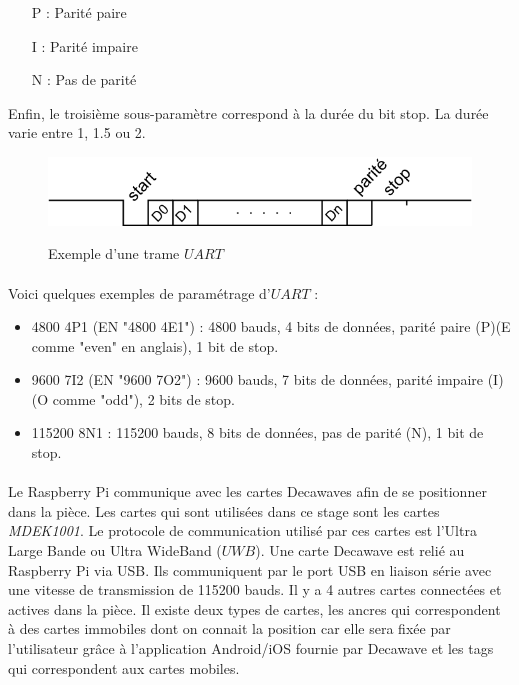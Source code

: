         \begin{itemize}
            \item[P : ] Parité paire
            \item[I : ] Parité impaire
            \item[N : ] Pas de parité 
        \end{itemize}
        
        Enfin, le troisième sous-paramètre correspond à la durée du bit stop. La durée varie entre 1, 1.5 ou 2.
        
        \begin{figure}[H]
            \centering
        	\begin{frame}{\includegraphics[width=1\textwidth]{image/trame_uart.png}}
        	\end{frame}
        	\caption{\label{fig:trameUART}Exemple d'une trame $UART$}
        \end{figure}
        
        \paragraph*{}
        Voici quelques exemples de paramétrage d'$UART$ :
        
        \begin{itemize}
            \item 4800 4P1 (EN "4800 4E1") : 4800 bauds, 4 bits de données, parité paire (P)(E comme "even" en anglais), 1 bit de stop.
            \item 9600 7I2 (EN "9600 7O2") : 9600 bauds, 7 bits de données, parité impaire (I)(O comme "odd"), 2 bits de stop.
            \item 115200 8N1 : 115200 bauds, 8 bits de données, pas de parité (N), 1 bit de stop.
        \end{itemize}
    
        \paragraph*{}
        Le Raspberry Pi communique avec les cartes Decawaves afin de se positionner dans la pièce. Les cartes qui sont utilisées dans ce stage sont les cartes \textit{MDEK1001}\cite{mdek}. Le protocole de communication utilisé par ces cartes est l'Ultra Large Bande ou Ultra WideBand ($UWB$). Une carte Decawave est relié au Raspberry Pi via USB. Ils communiquent par le port USB en liaison série avec une vitesse de transmission de 115200 bauds. Il y a 4 autres cartes connectées et actives dans la pièce. Il existe deux types de cartes, les ancres qui correspondent à des cartes immobiles dont on connait la position car elle sera fixée par l'utilisateur grâce à l'application Android/iOS fournie par Decawave\cite{androidAppliMdek} et les tags qui correspondent aux cartes mobiles.